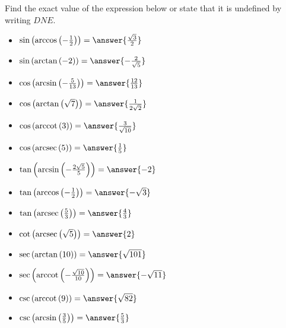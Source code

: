 \documentclass{ximera}
\author{Nela Lakos \and Kyle Parsons}
\begin{document}
\begin{exercise}

Find the exact value of the expression below or state that it is undefined by writing $DNE$.

\begin{itemize}
\item $\sin\left(\arccos\left(-\frac{1}{2}\right)\right) = \answer{\frac{\sqrt{3}}{2}}$
\item $\sin\left(\arctan\left(-2\right)\right) = \answer{-\frac{2}{\sqrt{5}}}$
\item $\cos\left(\arcsin\left(-\frac{5}{13}\right)\right) = \answer{\frac{12}{13}}$
\item $\cos\left(\arctan\left(\sqrt{7}\right)\right) = \answer{\frac{1}{2\sqrt{2}}}$
\item $\cos\left(\arccot\left(3\right)\right) = \answer{\frac{3}{\sqrt{10}}}$
\item $\cos\left(\arcsec\left(5\right)\right) = \answer{\frac{1}{5}}$
\item $\tan\left(\arcsin\left(-\frac{2\sqrt{5}}{5}\right)\right) = \answer{-2}$
\item $\tan\left(\arccos\left(-\frac{1}{2}\right)\right) = \answer{-\sqrt{3}}$
\item $\tan\left(\arcsec\left(\frac{5}{3}\right)\right) = \answer{\frac{4}{3}}$
\item $\cot\left(\arcsec\left(\sqrt{5}\right)\right) = \answer{2}$
\item $\sec\left(\arctan\left(10\right)\right) = \answer{\sqrt{101}}$
\item $\sec\left(\arccot\left(-\frac{\sqrt{10}}{10}\right)\right) = \answer{-\sqrt{11}}$
\item $\csc\left(\arccot\left(9\right)\right) = \answer{\sqrt{82}}$
\item $\csc\left(\arcsin\left(\frac{3}{5}\right)\right) = \answer{\frac{5}{3}}$
\end{itemize}

\end{exercise}
\end{document}

